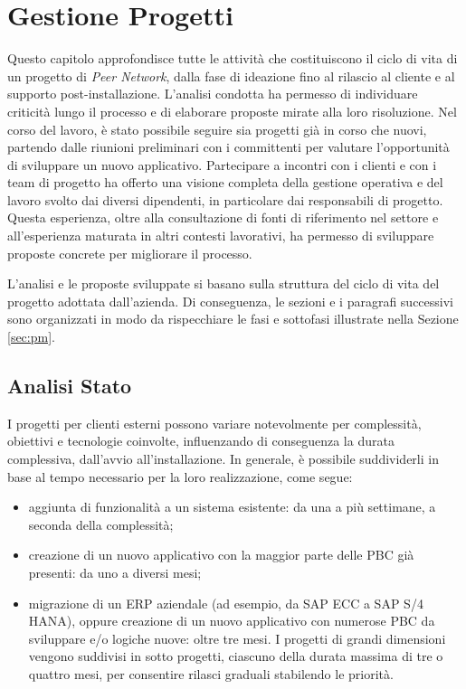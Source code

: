\chapter{Gestione Progetti}
\label{chap:pm}

Questo capitolo approfondisce tutte le attività che costituiscono il ciclo di vita
di un progetto di \textit{Peer Network}, dalla fase di ideazione fino al rilascio al cliente e al supporto post-installazione.
L’analisi condotta ha permesso di individuare criticità lungo il processo e di elaborare proposte mirate alla loro risoluzione.
Nel corso del lavoro, è stato possibile seguire sia progetti già in corso che nuovi, partendo dalle riunioni
preliminari con i committenti per valutare l’opportunità di sviluppare un nuovo applicativo. Partecipare a incontri
con i clienti e con i team di progetto ha offerto una visione completa della gestione operativa e del lavoro
svolto dai diversi dipendenti, in particolare dai responsabili di progetto. Questa esperienza, oltre alla
consultazione di fonti di riferimento nel settore e all’esperienza maturata in altri contesti lavorativi,
ha permesso di sviluppare proposte concrete per migliorare il processo.

L'analisi e le proposte sviluppate si basano sulla struttura del ciclo di vita del progetto adottata dall'azienda.
Di conseguenza, le sezioni e i paragrafi successivi sono organizzati in modo da rispecchiare le fasi e sottofasi illustrate
nella Sezione \ref{sec:pm}.

\section{Analisi Stato}
I progetti per clienti esterni possono variare notevolmente per complessità, obiettivi e tecnologie coinvolte, influenzando di conseguenza
la durata complessiva, dall'avvio all'installazione. In generale, è possibile suddividerli in base al tempo necessario per la loro
realizzazione, come segue:
\begin{itemize}
    \item aggiunta di funzionalità a un sistema esistente: da una a più settimane, a seconda della complessità;
    \item creazione di un nuovo applicativo con la maggior parte delle \ac{PBC} già presenti: da uno a diversi mesi;
    \item migrazione di un \ac{ERP} aziendale (ad esempio, da SAP ECC a SAP S/4 HANA), oppure creazione di un nuovo
    applicativo con numerose \ac{PBC} da sviluppare e/o logiche nuove: oltre tre mesi. I progetti di grandi dimensioni
    vengono suddivisi in sotto progetti, ciascuno della durata massima di tre o quattro mesi, per consentire rilasci graduali stabilendo le priorità.
\end{itemize}

